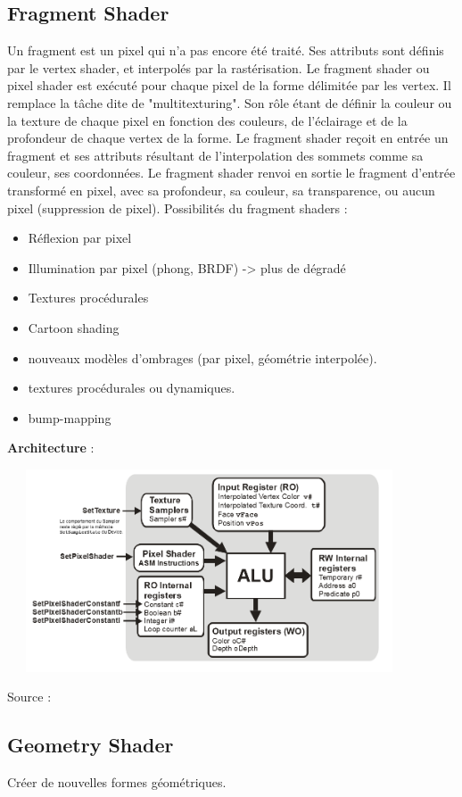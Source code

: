 \subsection{Fragment Shader}
Un fragment est un pixel qui n’a pas encore été traité. Ses attributs sont définis par le vertex shader, et interpolés par la rastérisation.
Le fragment shader ou pixel shader est exécuté pour chaque pixel de la forme délimitée par les vertex. Il remplace la tâche dite de "multitexturing". Son rôle étant de définir la couleur ou la texture de chaque pixel en fonction des couleurs, de l’éclairage et de la profondeur de chaque vertex de la forme.
Le fragment shader reçoit en entrée un fragment et ses attributs résultant de l’interpolation des sommets comme sa couleur, ses coordonnées.
Le fragment shader renvoi en sortie le fragment d’entrée transformé en pixel, avec sa profondeur, sa couleur, sa transparence, ou aucun pixel (suppression de pixel).
Possibilités du fragment shaders :
\begin{itemize}
	\item Réflexion par pixel
	\item Illumination par pixel (phong, BRDF) -> plus de dégradé
	\item Textures procédurales
	\item Cartoon shading
	\item nouveaux modèles d’ombrages (par pixel, géométrie interpolée).
	\item textures procédurales ou dynamiques.
	\item bump-mapping
\end{itemize}
\textbf{Architecture} :
\\
\begin{center}
\includegraphics[width=12cm,height=60mm]{pipeline/images/ArchiPixel.png}
\end{center}

Source : \cite{shader3}

\subsection{Geometry Shader}
Créer de nouvelles formes géométriques.
\\

